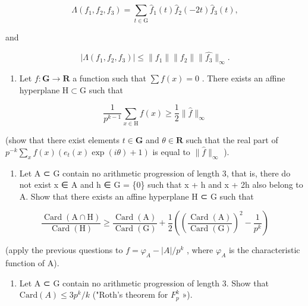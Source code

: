 \[
\Lambda (f _ {1}, f _ {2}, f _ {3}) = \sum_ {t \in \mathrm{G}} \widehat {f} _ {1} (t) \widehat {f} _ {2} (- 2 t) \widehat {f} _ {3} (t),
\]

and

\[
| \Lambda (f _ {1}, f _ {2}, f _ {3}) | \leqslant \| f _ {1} \| \| f _ {2} \| \| \widehat {f _ {3}} \| _ {\infty}.
\]

\begin{enumerate}
\def\labelenumi{\alph{enumi})}
\setcounter{enumi}{2}
\tightlist
\item
  Let \(f \colon \mathbf{G} \to \mathbf{R}\) a function such that \(\sum f(x) = 0\) . There exists an affine hyperplane \(\mathrm{H} \subset \mathrm{G}\) such that
\end{enumerate}

\[
\frac {1}{p ^ {k - 1}} \sum_ {x \in \mathrm{H}} f (x) \geqslant \frac {1}{2} \| \widehat {f} \| _ {\infty}
\]

(show that there exist elements \(t \in \mathbf{G}\) and \(\theta \in \mathbf{R}\) such that the real part of \(p^{-k} \sum_{x} f(x)(e_t(x) \exp(i\theta) + 1)\) is equal to \(\| \widehat{f} \|_{\infty}\) ).

\begin{enumerate}
\def\labelenumi{\alph{enumi})}
\setcounter{enumi}{3}
\tightlist
\item
  Let A ⊂ G contain no arithmetic progression of length 3, that is, there do not exist x ∈ A and h ∈ G = \{0\} such that x + h and x + 2h also belong to A. Show that there exists an affine hyperplane H ⊂ G such that
\end{enumerate}

\[
\frac {\operatorname{Card} (\mathrm{A} \cap \mathrm{H})}{\operatorname{Card} (\mathrm{H})} \geqslant \frac {\operatorname{Card} (\mathrm{A})}{\operatorname{Card} (\mathrm{G})} + \frac {1}{2} \left(\left(\frac {\operatorname{Card} (\mathrm{A})}{\operatorname{Card} (\mathrm{G})}\right) ^ {2} - \frac {1}{p ^ {k}}\right)
\]

(apply the previous questions to \(f = \varphi_{A} - |A|/p^{k}\) , where \(\varphi_{A}\) is the characteristic function of A).

\begin{enumerate}
\def\labelenumi{\alph{enumi})}
\setcounter{enumi}{4}
\tightlist
\item
  Let A ⊂ G contain no arithmetic progression of length 3. Show that \(\text{Card}(A) \leqslant 3p^{k}/k\) ("Roth's theorem for \(F_{p}^{k}\) »).
\end{enumerate}


